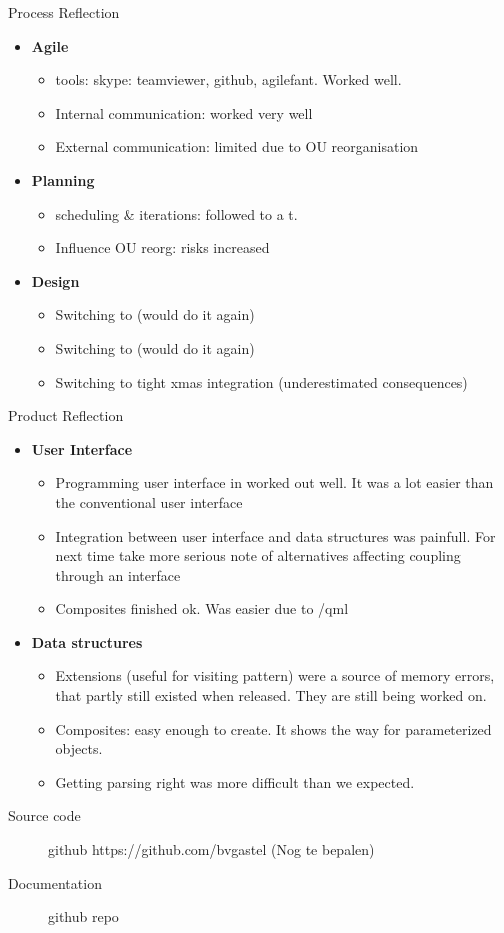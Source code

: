 \documentclass[11pt]{beamer}
\begin{document}
\begin{frame}{Process Reflection}
	\begin{itemize}
		\item {\bf Agile} 
				\begin{itemize}
					\item tools: skype: teamviewer, github, agilefant. Worked well.
					\item Internal communication: worked very well
					\item External communication: limited due to OU reorganisation
				\end{itemize}
		\item {\bf Planning}
				\begin{itemize}
					\item scheduling \& iterations: followed to a t.
					\item Influence OU reorg: risks increased
				\end{itemize}
		\item {\bf Design} 
			\begin{itemize}
				\item Switching to \qt				 (would do it again)
				\item Switching to \qml				 (would do it again)
				\item Switching to tight xmas integration (underestimated consequences)
			\end{itemize}
	\end{itemize}
\end{frame}

\begin{frame}{Product Reflection}
	\begin{itemize}
		\item {\bf User Interface} 
				\begin{itemize}
					\item Programming user interface in \qml worked out well.
							It was a lot easier than the conventional user interface
					\item Integration between user interface and data structures
							was painfull. For next time take more serious note
							of alternatives affecting coupling through an interface
					\item Composites finished ok. Was easier due to /qml
				\end{itemize}
		\item {\bf Data structures}
				\begin{itemize}
					\item Extensions (useful for visiting pattern) were a source
							of memory errors, that partly still existed when
							released. They are still being worked on.
					\item Composites: easy enough to create. It shows the way
							for parameterized objects.
					\item Getting parsing right was more difficult than we expected.
				\end{itemize}
	\end{itemize}
\end{frame}

\begin{frame}
	\begin{description}
		\item[Source code] github https://github.com/bvgastel (Nog te bepalen)
		\item[Documentation] github repo
	\end{description}
\end{frame}
\end{document}
